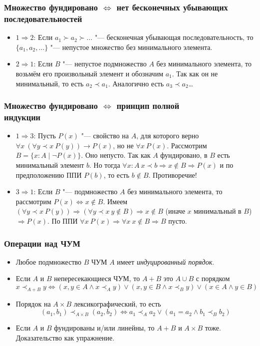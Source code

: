 \documentclass[10pt]{beamer}
\begin{document}
\begin{frame}
    \frametitle{Множество фундировано $\Leftrightarrow$ нет бесконечных убывающих последовательностей}
    \begin{itemize}
        \item $1 \Rightarrow 2$: Если $a_1 \succ a_2 \succ \ldots$ "--- бесконечная убывающая последовательность, то \pause \(\{a_1,a_2,\ldots\}\) "--- непустое множество без минимального элемента.
        \pause
        \item $2 \Rightarrow 1$: Если $B$ "--- непустое подмножество $A$ без минимального элемента, то \pause возьмём его произвольный элемент и обозначим $a_1$. \pause Так как он не минимальный, то есть $a_2 \prec a_1$. \pause Аналогично есть $a_3 \prec a_2$\ldots
    \end{itemize}
\end{frame}

\begin{frame}
    \frametitle{Множество фундировано $\Leftrightarrow$  принцип полной \\ индукции}
    \begin{itemize}
        \item $1 \Rightarrow 3$: Пусть $P(x)$ "--- свойство на $A$, для которого верно \( \forall x ~ (\forall y \prec x ~ P(y)) \to P(x) \), но не \( \forall x ~ P(x) \). Рассмотрим \(B = \{x:A \mid \neg P(x)\} \). Оно непусто. Так как $A$ фундировано, в $B$ есть минимальный элемент $b$. Но тогда \pause $\forall x : A ~ x \prec b \Rightarrow x \notin B \Rightarrow P(x)$ и по предположению ППИ $P(b)$, то есть $b \notin B$. Противоречие!
        \pause
        \item $3 \Rightarrow 1$: Если $B$ "--- подмножество $A$ без минимального элемента, то рассмотрим \( P(x) \Leftrightarrow x \notin B \). Имеем \((\forall y \prec x ~ P(y)) \Rightarrow (\forall y \prec x ~ y \notin B) \Rightarrow x \notin B \) (иначе $x$ минимальный в $B$) $\Rightarrow P(x)$\pause. По ППИ \( \forall x ~ P(x) \Rightarrow \forall x ~ x \notin B \Rightarrow B \) пусто.
    \end{itemize}
\end{frame}

\begin{frame}
    \frametitle{Операции над ЧУМ}
    \begin{itemize}
        \item Любое подмножество $B$ ЧУМ $A$ имеет \emph{индуцированный порядок}. 
        \item Если $A$ и $B$ непересекающиеся ЧУМ, то $A+B$ это $A \cup B$ с порядком \[ x \prec_{A+B} y \Leftrightarrow (x,y \in A \land x \prec_A y) \lor (x,y \in B \land x \prec_B y) \lor (x \in A \land y \in B) \]
        \item Порядок на $A \times B$ лексикографический, то есть 
        \[ (a_1, b_1) \prec_{A \times B} (a_2, b_2) \Leftrightarrow a_1 \prec_A a_2 \lor (a_1 = a_2 \land b_1 \prec_B b_2) \]
        \item Если $A$ и $B$ фундированы и/или линейны, то $A+B$ и $A \times B$ тоже. Доказательство как упражнение.
    \end{itemize}
\end{frame}
\end{document}
